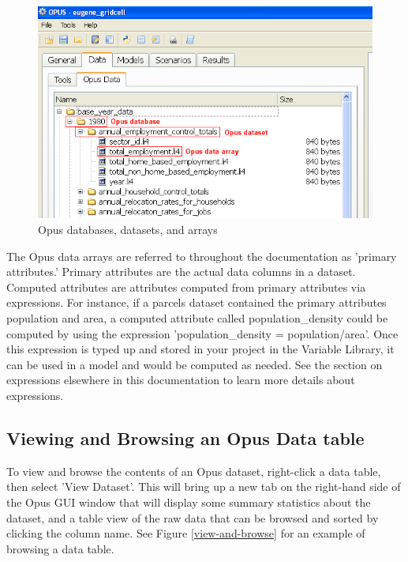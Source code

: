 \begin{figure}[htp]
\begin{center}
\includegraphics[scale=0.6]{part-gui/images/data-manager-opus-data-tab-db-dataset-array.png}
\end{center}
\caption{Opus databases, datasets, and arrays}
\label{fig:db-dataset-array}
\end{figure}

The Opus data arrays are referred to throughout the documentation as 'primary attributes.'  Primary attributes are the actual data columns in a dataset.  Computed attributes are attributes computed from primary attributes via expressions.  For instance, if a parcels dataset contained the primary attributes population and area, a computed attribute called population_density could be computed by using the expression 'population_density = population/area'.  Once this expression is typed up and stored in your project in the Variable Library, it can be used in a model and would be computed as needed.  See the section on expressions elsewhere in this documentation to learn more details about expressions.

\subsection{Viewing and Browsing an Opus Data table}
To view and browse the contents of an Opus dataset, right-click a data table, then select 'View Dataset'.  This will bring up a new tab on the right-hand side of the Opus GUI window that will display some summary statistics about the dataset, and a table view of the raw data that can be browsed and sorted by clicking the column name.  See Figure \ref{view-and-browse} for an example of browsing a data table.

